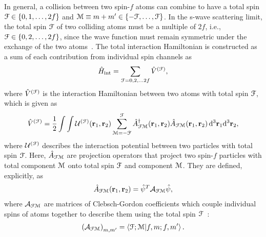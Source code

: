 In general, a collision between two spin-\(f\) atoms can combine to have a total
spin \(\EuScript{F} \in \{0, 1, \ldots, 2f\}\) and
\(\EuScript{M} \equiv m + m' \in \{-\EuScript{F}, \ldots, \EuScript{F}\}\).
In the s-wave scattering limit, the total spin \(\EuScript{F}\) of two colliding
atoms must be a multiple of \(2f\), i.e., \(\EuScript{F} \in
\{0, 2, \ldots, 2f\}\), since the wave function must remain symmetric under the
exchange of the two atoms~\cite{Pethick2008}.
The total interaction Hamiltonian is constructed as a sum of each
contribution from individual spin channels as~\cite{Kawaguchi2012}
\begin{align}\label{eq: general-interaction-hamiltonian}
    \hat{H}_\text{int} = \sum_{\EuScript{F}=0, 2, \ldots 2f}
    \hat{V}^{(\EuScript{F})},
\end{align}
where \(\hat{V}^{(\EuScript{F})}\) is the interaction Hamiltonian between two
atoms with total spin \(\EuScript{F}\), which is given as
\begin{align}\label{eq: spin-channel-hamiltonian-full-form}
    \hat{V}^{(\EuScript{F})} = \frac{1}{2}\int\int
    \mathcal{U}^{(\EuScript{F})}(\vb{r}_1, \vb{r}_2)
    \sum_{\EuScript{M}=-\EuScript{F}}^{\EuScript{F}}
    \hat{A}^\dagger_{\EuScript{F}\EuScript{M}}(\vb{r}_1, \vb{r}_2)
    \hat{A}_{\EuScript{F}\EuScript{M}}(\vb{r}_1, \vb{r}_2) \,
    \dd^3\vb{r}_1\dd^3\vb{r}_2,
\end{align} 
where \(\mathcal{U}^{(\EuScript{F})}\) describes the interaction potential
between two particles with total spin \(\EuScript{F}\).
Here, \(\hat{A}_{\EuScript{F}\EuScript{M}}\) are projection operators
that project two spin-\(f\) particles with total component \(\EuScript{M}\)
onto total spin \(\EuScript{F}\) and component \(\EuScript{M}\).
They are defined, explicitly, as
\begin{align}\label{eq: irreducible-operator}
    \hat{A}_{\EuScript{F}\EuScript{M}}(\vb{r}_1, \vb{r}_2) =
    \hat{\psi}^T\mathcal{A}_{\EuScript{F}\EuScript{M}}\hat{\psi},
\end{align}
where \(\mathcal{A}_{\EuScript{F}\EuScript{M}}\) are matrices of
Clebsch-Gordon coefficients which couple individual spins of atoms together
to describe them using the total spin \(\EuScript{F}\)~\cite{Kawaguchi2012}:
\begin{align}\label{eq: clebsch-gordon}
    {\left(\mathcal{A}_{\EuScript{F}\EuScript{M}}\right)}_{m,m'} =
    \braket{\EuScript{F}; \EuScript{M}}{f, m; f, m'}.
\end{align}

